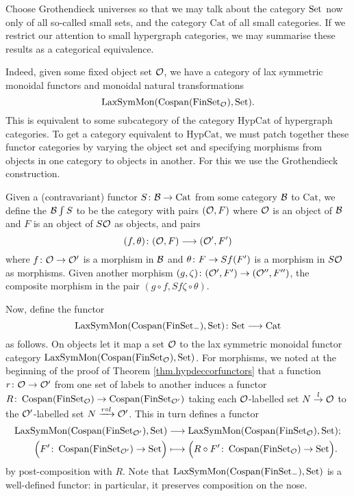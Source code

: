 Choose Grothendieck universes so that we may talk about the category $\mathrm{Set}$ now
only of all so-called small sets, and the category $\mathrm{Cat}$ of all small
categories. If we restrict our attention to small hypergraph categories, we may
summarise these results as a categorical equivalence. 

Indeed, given some fixed object set $\mathcal O$, we have a category of lax symmetric
monoidal functors and monoidal natural transformations
\[
  \mathrm{LaxSymMon}(\operatorname{{Cospan}}(\mathrm{FinSet}_{\mathcal O}),\mathrm{Set}).
\]
This is equivalent to some subcategory of the category $\mathrm{HypCat}$ of
hypergraph categories. To get a category equivalent to $\mathrm{HypCat}$, we
must patch together these functor categories by varying the object set and
specifying morphisms from objects in one category to objects in another. For
this we use the Grothendieck construction. 

Given a (contravariant) functor $S{\colon} \mathcal B \to \mathrm{Cat}$ from some
category $\mathcal B$ to $\mathrm{Cat}$, we define the  $\mathcal B \int S$ to be the category with pairs
$(\mathcal O,F)$ where $\mathcal O$ is an object of $\mathcal B$ and $F$ is an object of $S\mathcal
O$ as objects, and pairs 
\[
  (f,\theta){\colon} (\mathcal O,F) \longrightarrow (\mathcal O',F')
\]
where $f{\colon} \mathcal O \to \mathcal O'$ is a morphism in $\mathcal B$ and $\theta{\colon} F \to
Sf(F')$ is a morphism in $S\mathcal O$ as morphisms. Given another morphism
$(g,\zeta){\colon} (\mathcal O', F') \to (\mathcal O'',F'')$, the composite morphism in the
pair $(g \circ f, Sf\zeta \circ \theta)$.

Now, define the functor 
\[
  \mathrm{LaxSymMon}(\operatorname{{Cospan}}(\mathrm{FinSet}_{-}), \mathrm{Set}){\colon} \mathrm{Set} \longrightarrow
  \mathrm{Cat}
\]
as follows. On objects let it map a set $\mathcal O$ to the lax symmetric monoidal
functor category $\mathrm{LaxSymMon}(\operatorname{{Cospan}}(\mathrm{FinSet}_{\mathcal O}), \mathrm{Set})$. For
morphisms, we noted at the beginning of the proof of Theorem
\ref{thm.hypdeccorfunctors} that a function $r{\colon} \mathcal O \to \mathcal O'$ from one
set of labels to another induces a functor $R{\colon} \operatorname{{Cospan}}(\mathrm{FinSet}_{\mathcal O}) \to
\operatorname{{Cospan}}(\mathrm{FinSet}_{\mathcal O'})$ taking each $\mathcal O$-labelled set $N \stackrel{l}\to
\mathcal O$ to the $\mathcal O'$-labelled set $N \xrightarrow{r \circ l} \mathcal O'$. This in
turn defines a functor 
\begin{align*}
 \mathrm{LaxSymMon}(\operatorname{{Cospan}}(\mathrm{FinSet}_{\mathcal O'}), \mathrm{Set}) &\longrightarrow
\mathrm{LaxSymMon}(\operatorname{{Cospan}}(\mathrm{FinSet}_{\mathcal O}), \mathrm{Set}); \\
\Big(F'{\colon}
\operatorname{{Cospan}}(\mathrm{FinSet}_{\mathcal O'}) \to \mathrm{Set}\Big) &\longmapsto \Big(R\circ F'{\colon}  \operatorname{{Cospan}}(\mathrm{FinSet}_{\mathcal O})
\to \mathrm{Set}\Big).
\end{align*}
by post-composition with $R$. Note that
$\mathrm{LaxSymMon}(\operatorname{{Cospan}}(\mathrm{FinSet}_{-}), \mathrm{Set})$ is a well-defined functor: in
particular, it preserves composition on the nose.

